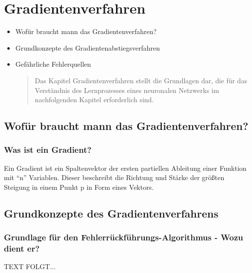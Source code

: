 \newpage
\thispagestyle{empty}
\section{Gradientenverfahren}\label{sec:gradientenverfahren}   
\begin{tcolorbox}[title={Inhalte des \textit{Gradientenverfahren}}]
  \begin{itemize}
    \item Wofür braucht mann das Gradientenverfahren?
    \item Grundkonzepte des Gradientenabstiegsverfahren
    \item Gefährliche Fehlerquellen
  \begin{quotation}\noindent
      Das Kapitel Gradientenverfahren stellt die Grundlagen dar, die für das Verständnis des Lernprozesses eines neuronalen Netzwerks im nachfolgenden Kapitel erforderlich sind.
  \end{quotation}
  \end{itemize}
\end{tcolorbox}


\subsection{Wofür braucht mann das Gradientenverfahren?}\label{subsec:gradientenverfahren:wofuer}
\subsubsection{Was ist ein Gradient?}\label{subsec:gradientenverfahren:was_ist_gradient}
  Ein Gradient ist ein Spaltenvektor der ersten partiellen Ableitung einer Funktion mit “n” Variablen.
  Dieser beschreibt die Richtung und Stärke der größten Steigung in einem Punkt p in Form eines Vektors.\cite{JH20}


\subsection{Grundkonzepte des Gradientenverfahrens}\label{subsec:gradientenverfahren:grundkonzepte}
\subsubsection{Grundlage für den Fehlerrückführungs-Algorithmus - Wozu dient er?}\label{subsec:gradientenverfahren:grundlage_fehlerrueckfuehrungsalg}
  TEXT FOLGT...

